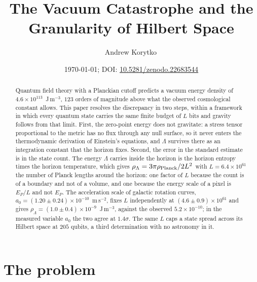 \documentclass[aps,prd,twocolumn,superscriptaddress,nofootinbib,showkeys]{revtex4-2}
\begin{document}
\title{The Vacuum Catastrophe and the Granularity of Hilbert Space}

\author{Andrew Korytko\,}

\date{\today; DOI: \href{https://doi.org/10.5281/zenodo.22683544}{10.5281/zenodo.22683544}}

\begin{abstract}
Quantum field theory with a Planckian cutoff predicts a vacuum energy density of $4.6\times10^{113}$~J\,m$^{-3}$, $123$ orders of magnitude above what the observed cosmological constant allows. This paper resolves the discrepancy in two steps, within a framework in which every quantum state carries the same finite budget of $L$ bits and gravity follows from that limit. First, the zero-point energy does not gravitate: a stress tensor proportional to the metric has no flux through any null surface, so it never enters the thermodynamic derivation of Einstein's equations, and $\Lambda$ survives there as an integration constant that the horizon fixes. Second, the error in the standard estimate is in the state count. The energy $\Lambda$ carries inside the horizon is the horizon entropy times the horizon temperature, which gives $\rho_\Lambda = 3\pi\rho_{\rm Planck}/2L^2$ with $L = 6.4\times10^{61}$ the number of Planck lengths around the horizon: one factor of $L$ because the count is of a boundary and not of a volume, and one because the energy scale of a pixel is $E_P/L$ and not $E_P$. The acceleration scale of galactic rotation curves, $a_0 = (1.20\pm0.24)\times10^{-10}$~m\,s$^{-2}$, fixes $L$ independently at $(4.6\pm0.9)\times10^{61}$ and gives $\rho_\Lambda = (1.0\pm0.4)\times10^{-9}$~J\,m$^{-3}$, against the observed $5.2\times10^{-10}$; in the measured variable $a_0$ the two agree at $1.4\sigma$. The same $L$ caps a state spread across its Hilbert space at $205$ qubits, a third determination with no astronomy in it.
\end{abstract}


\maketitle

\section{The problem}
\label{sec:intro}
\end{document}
